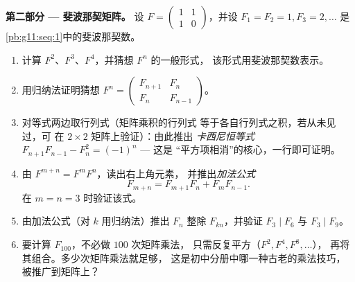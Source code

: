 \begin{problem}
\medskip
\noindent\textbf{第二部分 --- 斐波那契矩阵。}
设 $F = \begin{pmatrix} 1 & 1\\ 1 & 0\end{pmatrix}$，并设
$F_1 = F_2 = 1, F_3 = 2, \dots$ 是
\cref{pb:g11:seq:1}中的斐波那契数。
\begin{enumerate}[resume]
  \item 计算 $F^2$、$F^3$、$F^4$，并猜想 $F^n$ 的一般形式，
        该形式用斐波那契数表示。
  \item 用归纳法证明猜想
        $F^n = \begin{pmatrix} F_{n+1} & F_n\\ F_n & F_{n-1}
        \end{pmatrix}$。
  \item 对等式两边取行列式（矩阵乘积的行列式
        等于各自行列式之积，若从未见过，可
        在 $2 \times 2$ 矩阵上验证）：由此推出
        \emph{卡西尼恒等式}
        $F_{n+1}F_{n-1} - F_n^2 = (-1)^n$ --- 这是
        “平方项相消”的核心，一行即可证明。
  \item 由 $F^{m+n} = F^m F^n$，读出右上角元素，
        并推出\emph{加法公式}
        \[
        F_{m+n} = F_{m+1} F_n + F_m F_{n-1} .
        \]
        在 $m = n = 3$ 时验证该式。
  \item 由加法公式（对 $k$ 用归纳法）推出
        $F_n$ 整除 $F_{kn}$，并验证
        $F_3 \mid F_6$ 与 $F_3 \mid F_9$。
  \item 要计算 $F_{100}$，不必做 $100$ 次矩阵乘法，
        只需反复平方（$F^2, F^4, F^8, \dots$），
        再将其组合。多少次矩阵乘法就足够，
        这是初中分册中哪一种古老的乘法技巧，
        被推广到矩阵上？
\end{enumerate}


\end{problem}
